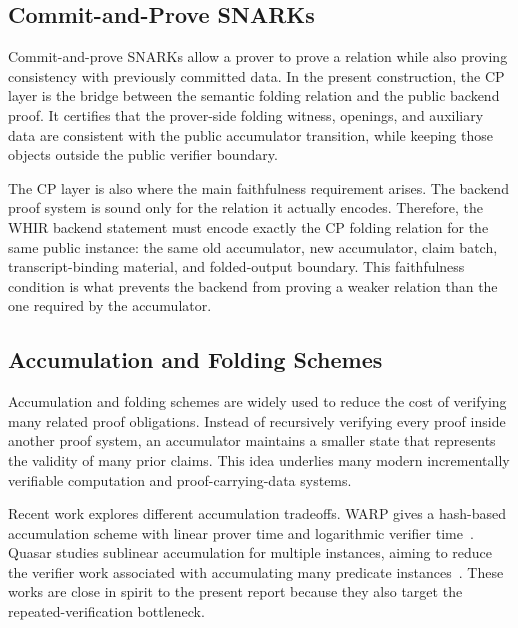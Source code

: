 \documentclass[11pt]{article}
\theoremstyle{definition}
\begin{document}
\subsection{Commit-and-Prove SNARKs}

Commit-and-prove SNARKs allow a prover to prove a relation while also proving
consistency with previously committed data. In the present construction, the CP
layer is the bridge between the semantic folding relation and the public backend
proof. It certifies that the prover-side folding witness, openings, and auxiliary
data are consistent with the public accumulator transition, while keeping those
objects outside the public verifier boundary.

The CP layer is also where the main faithfulness requirement arises. The backend
proof system is sound only for the relation it actually encodes. Therefore, the
WHIR backend statement must encode exactly the CP folding relation for the same
public instance: the same old accumulator, new accumulator, claim batch,
transcript-binding material, and folded-output boundary. This faithfulness
condition is what prevents the backend from proving a weaker relation than the
one required by the accumulator.

\subsection{Accumulation and Folding Schemes}

Accumulation and folding schemes are widely used to reduce the cost of verifying
many related proof obligations. Instead of recursively verifying every proof
inside another proof system, an accumulator maintains a smaller state that
represents the validity of many prior claims. This idea underlies many modern
incrementally verifiable computation and proof-carrying-data systems.

Recent work explores different accumulation tradeoffs. WARP gives a
hash-based accumulation scheme with linear prover time and logarithmic verifier
time~\cite{WARP}. Quasar studies sublinear accumulation for multiple
instances, aiming to reduce the verifier work associated with accumulating many
predicate instances~\cite{Quasar}. These works are close in spirit to the
present report because they also target the repeated-verification bottleneck.
\end{document}
